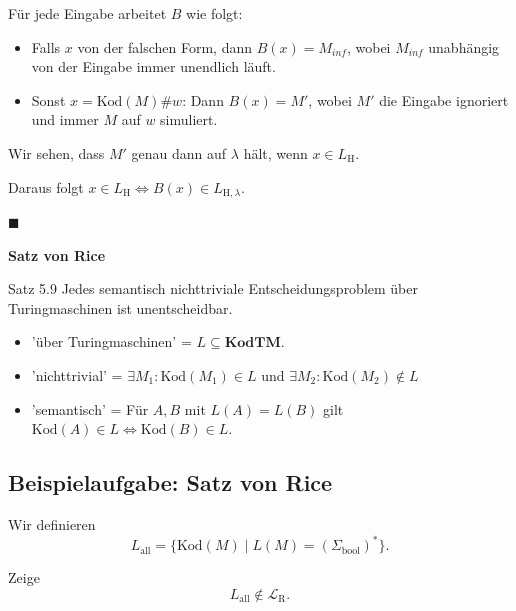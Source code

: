 \documentclass[a4paper, 11pt]{article}
\def\Lr{\mathcal{L}_\text{R}}
\newcommand\myTitle[1]{{\large \textbf {#1}}}
\begin{document}
                    Für jede Eingabe arbeitet $B$ wie folgt:
                    \begin{itemize}
                        \item Falls $x$ von der falschen Form, dann $B(x) = M_{inf}$, wobei $M_{inf}$ unabhängig von der Eingabe immer unendlich läuft.
                        \item Sonst $x = \text{Kod}(M)\#w$: Dann $B(x) = M'$, wobei $M'$ die Eingabe ignoriert und immer $M$ auf $w$ simuliert.
                    \end{itemize}
                
                    Wir sehen, dass $M'$ genau dann auf $\lambda$ hält, wenn $x \in L_{\text{H}}$.
                
                    Daraus folgt $x \in L_\text{H} \iff B(x) \in L_{\text{H}, \lambda}$.
                
                    \hspace*{0pt}\hfill$\blacksquare$
                
                    \myTitle{Satz von Rice}
                    \begin{mainbox}{Satz 5.9}
                        Jedes semantisch nichttriviale Entscheidungsproblem über Turingmaschinen ist unentscheidbar.
                    \end{mainbox}
                    \begin{itemize}
                        \item 'über Turingmaschinen' = $L \subseteq \textbf{KodTM}$.
                        \item 'nichttrivial' = $\exists M_1: \text{Kod}(M_1) \in L$ und $\exists M_2: \text{Kod}(M_2) \notin L$
                        \item 'semantisch' = Für $A, B$ mit $L(A) = L(B)$ gilt $\text{Kod}(A) \in L \iff \text{Kod}(B) \in L$.
                    \end{itemize}
                
                    
                
                    \subsection{Beispielaufgabe: Satz von Rice}
                    Wir definieren $$L_{\text{all}} = \{\text{Kod}(M) \mid L(M) = (\Sigma_{\text{bool}})^*\}.$$
                
                    Zeige $$L_{\text{all}} \notin \Lr.$$
                
\end{document}
